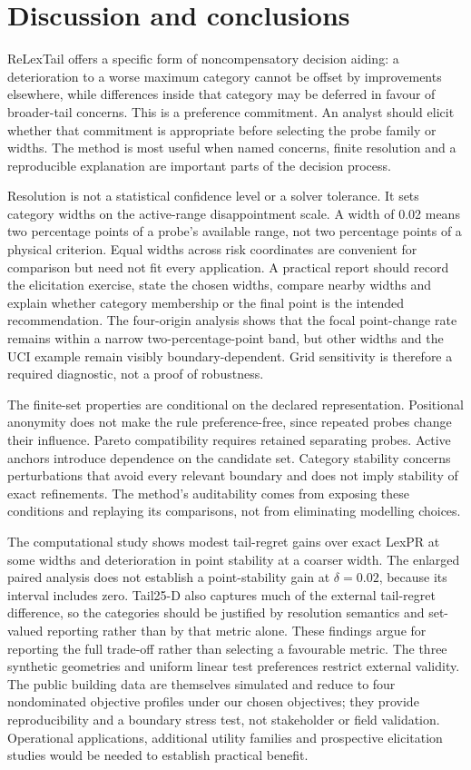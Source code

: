 \section{Discussion and conclusions}
\label{sec:discussion}
ReLexTail offers a specific form of noncompensatory decision aiding: a deterioration to a worse maximum category cannot be offset by improvements elsewhere, while differences inside that category may be deferred in favour of broader-tail concerns. This is a preference commitment. An analyst should elicit whether that commitment is appropriate before selecting the probe family or widths. The method is most useful when named concerns, finite resolution and a reproducible explanation are important parts of the decision process.

Resolution is not a statistical confidence level or a solver tolerance. It sets category widths on the active-range disappointment scale. A width of 0.02 means two percentage points of a probe's available range, not two percentage points of a physical criterion. Equal widths across risk coordinates are convenient for comparison but need not fit every application. A practical report should record the elicitation exercise, state the chosen widths, compare nearby widths and explain whether category membership or the final point is the intended recommendation. The four-origin analysis shows that the focal point-change rate remains within a narrow two-percentage-point band, but other widths and the UCI example remain visibly boundary-dependent. Grid sensitivity is therefore a required diagnostic, not a proof of robustness.

The finite-set properties are conditional on the declared representation. Positional anonymity does not make the rule preference-free, since repeated probes change their influence. Pareto compatibility requires retained separating probes. Active anchors introduce dependence on the candidate set. Category stability concerns perturbations that avoid every relevant boundary and does not imply stability of exact refinements. The method's auditability comes from exposing these conditions and replaying its comparisons, not from eliminating modelling choices.

The computational study shows modest tail-regret gains over exact LexPR at some widths and deterioration in point stability at a coarser width. The enlarged paired analysis does not establish a point-stability gain at $\delta=0.02$, because its interval includes zero. Tail25-D also captures much of the external tail-regret difference, so the categories should be justified by resolution semantics and set-valued reporting rather than by that metric alone. These findings argue for reporting the full trade-off rather than selecting a favourable metric. The three synthetic geometries and uniform linear test preferences restrict external validity. The public building data are themselves simulated and reduce to four nondominated objective profiles under our chosen objectives; they provide reproducibility and a boundary stress test, not stakeholder or field validation. Operational applications, additional utility families and prospective elicitation studies would be needed to establish practical benefit.

